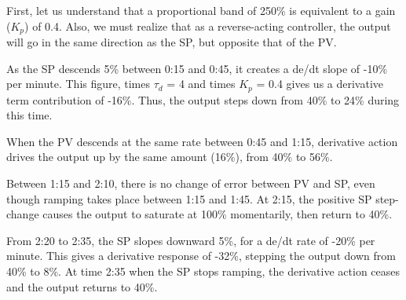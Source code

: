 First, let us understand that a proportional band of 250\% is equivalent to a gain ($K_p$) of 0.4.  Also, we must realize that as a reverse-acting controller, the output will go in the same direction as the SP, but opposite that of the PV.
 
\vskip 10pt

As the SP descends 5\% between 0:15 and 0:45, it creates a de/dt slope of -10\% per minute.  This figure, times $\tau_d$ = 4 and times $K_p$ = 0.4 gives us a derivative term contribution of -16\%.  Thus, the output steps down from 40\% to 24\% during this time.

When the PV descends at the same rate between 0:45 and 1:15, derivative action drives the output up by the same amount (16\%), from 40\% to 56\%.

Between 1:15 and 2:10, there is no change of error between PV and SP, even though ramping takes place between 1:15 and 1:45.  At 2:15, the positive SP step-change causes the output to saturate at 100\% momentarily, then return to 40\%.

From 2:20 to 2:35, the SP slopes downward 5\%, for a de/dt rate of -20\% per minute.  This gives a derivative response of -32\%, stepping the output down from 40\% to 8\%.  At time 2:35 when the SP stops ramping, the derivative action ceases and the output returns to 40\%.











